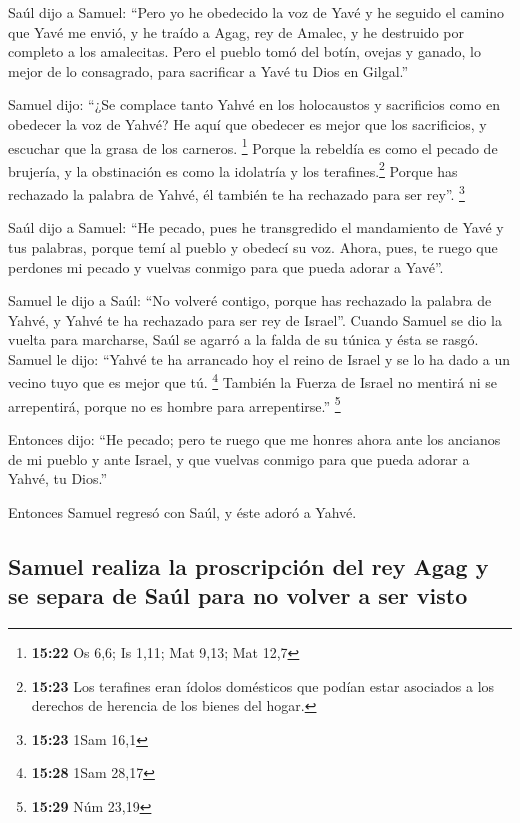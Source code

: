  Saúl dijo a Samuel: ``Pero yo he obedecido la voz de
Yavé y he seguido el camino que Yavé me envió, y he traído a Agag, rey
de Amalec, y he destruido por completo a los amalecitas. 
Pero el pueblo tomó del botín, ovejas y ganado, lo mejor de lo
consagrado, para sacrificar a Yavé tu Dios en Gilgal.''

 Samuel dijo: ``¿Se complace tanto Yahvé en los
holocaustos y sacrificios como en obedecer la voz de Yahvé? He aquí que
obedecer es mejor que los sacrificios, y escuchar que la grasa de los
carneros. \footnote{\textbf{15:22} Os 6,6; Is 1,11; Mat 9,13; Mat 12,7}
 Porque la rebeldía es como el pecado de brujería, y la
obstinación es como la idolatría y los terafines.\footnote{\textbf{15:23}
  Los terafines eran ídolos domésticos que podían estar asociados a los
  derechos de herencia de los bienes del hogar.} Porque has rechazado la
palabra de Yahvé, él también te ha rechazado para ser rey''. \footnote{\textbf{15:23}
  1Sam 16,1}

 Saúl dijo a Samuel: ``He pecado, pues he transgredido el
mandamiento de Yavé y tus palabras, porque temí al pueblo y obedecí su
voz.  Ahora, pues, te ruego que perdones mi pecado y
vuelvas conmigo para que pueda adorar a Yavé''.

 Samuel le dijo a Saúl: ``No volveré contigo, porque has
rechazado la palabra de Yahvé, y Yahvé te ha rechazado para ser rey de
Israel''.  Cuando Samuel se dio la vuelta para marcharse,
Saúl se agarró a la falda de su túnica y ésta se rasgó. 
Samuel le dijo: ``Yahvé te ha arrancado hoy el reino de Israel y se lo
ha dado a un vecino tuyo que es mejor que tú. \footnote{\textbf{15:28}
  1Sam 28,17}  También la Fuerza de Israel no mentirá ni
se arrepentirá, porque no es hombre para arrepentirse.'' \footnote{\textbf{15:29}
  Núm 23,19}

 Entonces dijo: ``He pecado; pero te ruego que me honres
ahora ante los ancianos de mi pueblo y ante Israel, y que vuelvas
conmigo para que pueda adorar a Yahvé, tu Dios.''

 Entonces Samuel regresó con Saúl, y éste adoró a Yahvé.

\hypertarget{samuel-realiza-la-proscripciuxf3n-del-rey-agag-y-se-separa-de-sauxfal-para-no-volver-a-ser-visto}{%
\subsection{Samuel realiza la proscripción del rey Agag y se separa de
Saúl para no volver a ser
visto}\label{samuel-realiza-la-proscripciuxf3n-del-rey-agag-y-se-separa-de-sauxfal-para-no-volver-a-ser-visto}}

